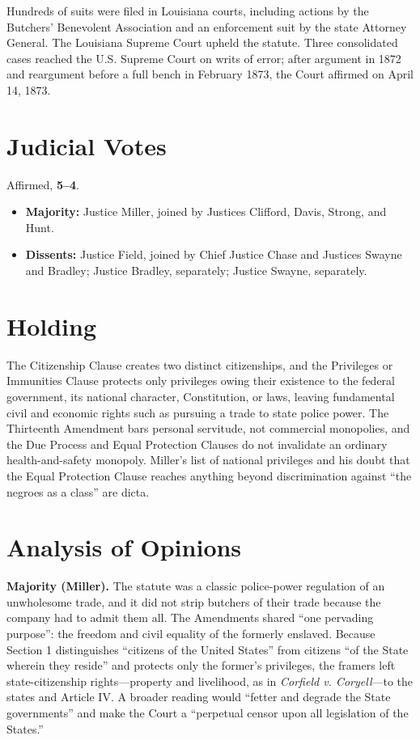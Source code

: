 \documentclass[12pt]{article}
\begin{document}
Hundreds of suits were filed in Louisiana courts, including actions by the Butchers' Benevolent Association and an enforcement suit by the state Attorney General. The Louisiana Supreme Court upheld the statute. Three consolidated cases reached the U.S. Supreme Court on writs of error; after argument in 1872 and reargument before a full bench in February 1873, the Court affirmed on April 14, 1873.

\section{Judicial Votes}

Affirmed, \textbf{5--4}.
\begin{itemize}
\item \textbf{Majority:} Justice Miller, joined by Justices Clifford, Davis, Strong, and Hunt.
\item \textbf{Dissents:} Justice Field, joined by Chief Justice Chase and Justices Swayne and Bradley; Justice Bradley, separately; Justice Swayne, separately.
\end{itemize}

\section{Holding}

The Citizenship Clause creates two distinct citizenships, and the Privileges or Immunities Clause protects only privileges owing their existence to the federal government, its national character, Constitution, or laws, leaving fundamental civil and economic rights such as pursuing a trade to state police power. The Thirteenth Amendment bars personal servitude, not commercial monopolies, and the Due Process and Equal Protection Clauses do not invalidate an ordinary health-and-safety monopoly. Miller's list of national privileges and his doubt that the Equal Protection Clause reaches anything beyond discrimination against ``the negroes as a class'' are dicta.

\section{Analysis of Opinions}

\textbf{Majority (Miller).} The statute was a classic police-power regulation of an unwholesome trade, and it did not strip butchers of their trade because the company had to admit them all. The Amendments shared ``one pervading purpose'': the freedom and civil equality of the formerly enslaved. Because Section 1 distinguishes ``citizens of the United States'' from citizens ``of the State wherein they reside'' and protects only the former's privileges, the framers left state-citizenship rights---property and livelihood, as in \textit{Corfield v. Coryell}---to the states and Article IV. A broader reading would ``fetter and degrade the State governments'' and make the Court a ``perpetual censor upon all legislation of the States.''
\end{document}
